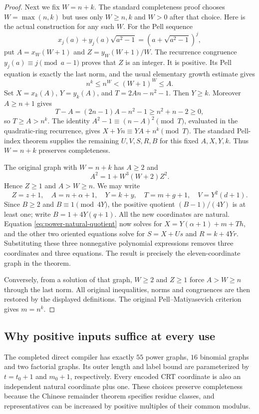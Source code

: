 \begin{proof}
Next we fix $W=n+k$. The standard completeness proof chooses
$W=\max(n,k)$ but uses only $W\ge n,k$ and $W>0$ after that choice.
Here is the actual construction for any such $W$. For the Pell sequence
\[
 x_j(a)+y_j(a)\sqrt{a^2-1}
       =(a+\sqrt{a^2-1})^j,
\]
put $A=x_W(W+1)$ and $Z=y_W(W+1)/W$. The recurrence congruence
$y_j(a)\equiv j\pmod{a-1}$ proves that $Z$ is an integer. It is
positive. Its Pell equation is exactly the last norm, and the usual
elementary growth estimate gives
\[
 n^k\le n^W<(W+1)^W\le A.
\]
Set $X=x_k(A)$, $Y=y_k(A)$, and $T=2An-n^2-1$. Then $Y\ge k$.
Moreover $A\ge n+1$ gives
\[
 T-A=(2n-1)A-n^2-1\ge n^2+n-2\ge0,
\]
so $T\ge A>n^k$. The identity
$A^2-1\equiv(n-A)^2\pmod T$, evaluated in the quadratic-ring
recurrence, gives $X+Yn\equiv YA+n^k\pmod T$. The standard
Pell-index theorem supplies the remaining $U,V,S,R,B$ for this fixed
$A,X,Y,k$. Thus $W=n+k$ preserves completeness.

The original graph with $W=n+k$ has $A\ge2$ and
\[
 A^2=1+W^3(W+2)Z^2.
\]
Hence $Z\ge1$ and $A>W\ge n$. We may write
\[
 Z=z+1,\quad A=n+\alpha+1,\quad Y=k+y,
 \quad T=m+g+1,\quad V=Y^2(d+1).
\]
Since $B\ge2$ and $B\equiv1\pmod{4Y}$, the positive quotient
$(B-1)/(4Y)$ is at least one; write $B=1+4Y(q+1)$.
All the new coordinates are natural. Equation
\eqref{eq:power-natural-quotient} now solves for
$X=Y(\alpha+1)+m+Th$, and the other two oriented equations solve
for $S=X+Us$ and $R=k+4Yr$. Substituting these three nonnegative
polynomial expressions removes three coordinates and three equations.
The result is precisely the eleven-coordinate graph in the theorem.

Conversely, from a solution of that graph, $W\ge2$ and $Z\ge1$
force $A>W\ge n$ through the last norm. All original inequalities,
norms and congruences are then restored by the displayed definitions.
The original Pell--Matiyasevich criterion gives $m=n^k$.
\end{proof}

\subsection{Why positive inputs suffice at every use}

The completed direct compiler has exactly $55$ power graphs, $16$
binomial graphs and two factorial graphs. Its outer length and label
bound are parameterized by $t=t_0+1$ and $m_0+1$, respectively.
Every encoded CRT coordinate is also an independent natural coordinate
plus one. These choices preserve completeness because the Chinese
remainder theorem specifies residue classes, and representatives can
be increased by positive multiples of their common modulus.

